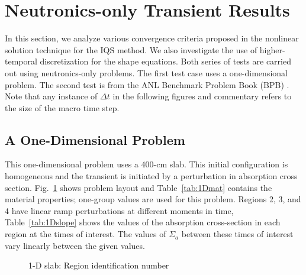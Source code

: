 \documentclass{elsarticle}
\newcommand{\fig}[1]{Fig.~\ref{#1}}                      %
\newcommand{\tbl}[1]{Table~\ref{#1}}                     %
\begin{document}
\section{Neutronics-only Transient Results}

In this section, we analyze various convergence criteria proposed in the nonlinear solution technique for the IQS method. We also investigate the use of higher-temporal discretization for the shape equations. Both series of tests are carried out using neutronics-only problems.  The first test case uses a one-dimensional problem. The second test is from the ANL Benchmark Problem Book (BPB) \cite{ANL_BPB}. Note that any instance of $\Delta t$ in the following figures and commentary refers to the size of the macro time step.

\subsection{A One-Dimensional Problem}

This one-dimensional problem uses a 400-cm slab. This initial configuration is homogeneous and the transient is initiated by a perturbation in absorption cross section. \fig{fig:slab} shows problem layout and \tbl{tab:1Dmat} contains the material properties; one-group values are used for this problem. Regions 2, 3, and 4 have linear ramp perturbations at different moments in time, \tbl{tab:1Dslope} shows the values of the absorption cross-section in each region at the times of interest.  The values of $\Sigma_a$ between these times of interest vary linearly between the given values.

\begin{figure}[!htbp]
\begin{center}
\caption{1-D slab: Region identification number}
\label{fig:slab}
\end{center}
\end{figure}
\end{document}
